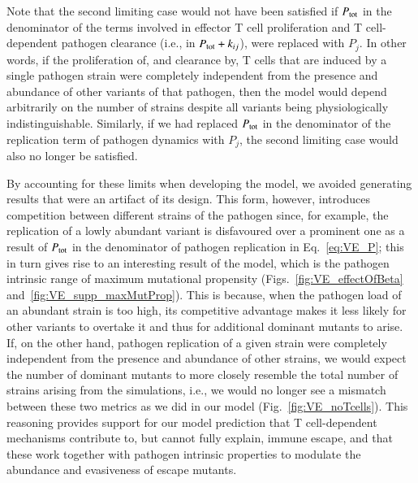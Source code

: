 Note that the second limiting case would not have been satisfied if $P_{\textup{tot}}$ in the denominator of the terms involved in effector T cell proliferation and T cell-dependent pathogen clearance (i.e., in $P_{\textup{tot}} + k_{ij}$), were replaced with $P_j$. In other words, if the proliferation of, and clearance by, T cells that are induced by a single pathogen strain were completely independent from the presence and abundance of other variants of that pathogen, then the model would depend arbitrarily on the number of strains despite all variants being physiologically indistinguishable. Similarly, if we had replaced $P_{\textup{tot}}$ in the denominator of the replication term of pathogen dynamics with $P_j$, the second limiting case would also no longer be satisfied.

By accounting for these limits when developing the model, we avoided generating results that were an artifact of its design. This form, however, introduces competition between different strains of the pathogen since, for example, the replication of a lowly abundant variant is disfavoured over a prominent one as a result of $P_{\textup{tot}}$ in the denominator of pathogen replication in Eq.~\eqref{eq:VE_P}; this in turn gives rise to an interesting result of the model, which is the pathogen intrinsic range of maximum mutational propensity (Figs.~\ref{fig:VE_effectOfBeta} and~\ref{fig:VE_supp_maxMutProp}). This is because, when the pathogen load of an abundant strain is too high, its competitive advantage makes it less likely for other variants to overtake it and thus for additional dominant mutants to arise. If, on the other hand, pathogen replication of a given strain were completely independent from the presence and abundance of other strains, we would expect the number of dominant mutants to more closely resemble the total number of strains arising from the simulations, i.e., we would no longer see a mismatch between these two metrics as we did in our model (Fig.~\ref{fig:VE_noTcells}). This reasoning provides support for our model prediction that T cell-dependent mechanisms contribute to, but cannot fully explain, immune escape, and that these work together with pathogen intrinsic properties to modulate the abundance and evasiveness of escape mutants.

\renewcommand{\thefigure}{\thechapter.\arabic{figure}}
\renewcommand{\figurename}{Figure}
\setcounter{figure}{0}